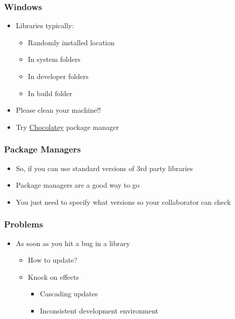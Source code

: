 \subsubsection{Windows}\label{windows}

\begin{itemize}
\itemsep1pt\parskip0pt
\item
  Libraries typically:

  \begin{itemize}
  \itemsep1pt\parskip0pt
  \item
    Randomly installed location
  \item
    In system folders
  \item
    In developer folders
  \item
    In build folder
  \end{itemize}
\item
  Please clean your machine!!
\item
  Try \href{http://chocolatey.org}{Chocolatey} package manager
\end{itemize}

\subsubsection{Package Managers}\label{package-managers-1}

\begin{itemize}
\itemsep1pt\parskip0pt
\item
  So, if you can use standard versions of 3rd party libraries
\item
  Package managers are a good way to go
\item
  You just need to specify what versions so your collaborator can check
\end{itemize}

\subsubsection{Problems}\label{problems}

\begin{itemize}
\itemsep1pt\parskip0pt
\item
  As soon as you hit a bug in a library

  \begin{itemize}
  \itemsep1pt\parskip0pt
  \item
    How to update?
  \item
    Knock on effects

    \begin{itemize}
    \itemsep1pt\parskip0pt
    \item
      Cascading updates
    \item
      Inconsistent development environment
    \end{itemize}
  \end{itemize}
\end{itemize}

